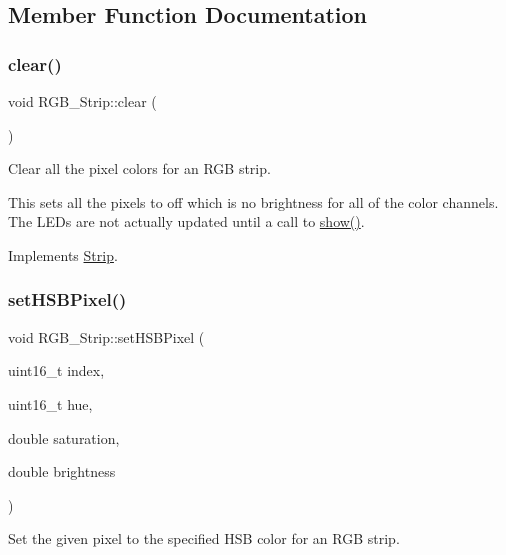 \subsection{Member Function Documentation}
\mbox{\label{classRGB__Strip_a68257e7b8afda71ad51b862b428e3e63}} 
\subsubsection{\texorpdfstring{clear()}{clear()}}
{\footnotesize\ttfamily void R\+G\+B\+\_\+\+Strip\+::clear (\begin{DoxyParamCaption}{ }\end{DoxyParamCaption})\hspace{0.3cm}{\ttfamily [virtual]}}



Clear all the pixel colors for an R\+GB strip. 

This sets all the pixels to off which is no brightness for all of the color channels. The L\+E\+Ds are not actually updated until a call to \mbox{\hyperlink{classRGB__Strip_a0cadc931b23e8d5f0ee4bfd8eac92e0b}{show()}}. 

Implements \mbox{\hyperlink{classStrip}{Strip}}.

\mbox{\label{classRGB__Strip_a4f95a2aa9d7af3a68a546b54e51e27ed}} 
\subsubsection{\texorpdfstring{setHSBPixel()}{setHSBPixel()}}
{\footnotesize\ttfamily void R\+G\+B\+\_\+\+Strip\+::set\+H\+S\+B\+Pixel (\begin{DoxyParamCaption}\item[{uint16\+\_\+t}]{index,  }\item[{uint16\+\_\+t}]{hue,  }\item[{double}]{saturation,  }\item[{double}]{brightness }\end{DoxyParamCaption})\hspace{0.3cm}{\ttfamily [virtual]}}



Set the given pixel to the specified H\+SB color for an R\+GB strip. 

